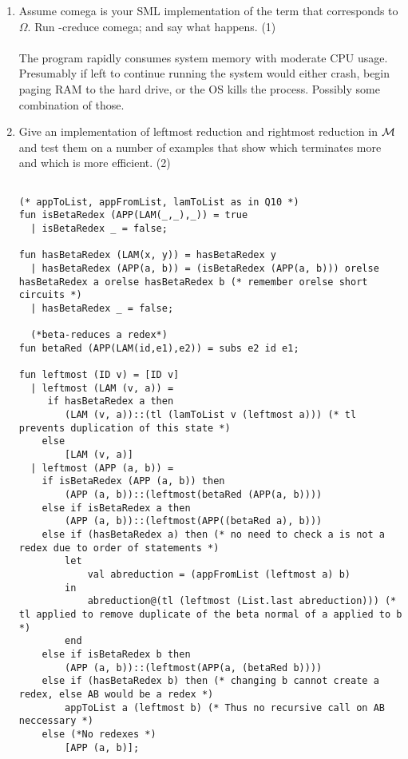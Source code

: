\documentclass[11pt]{article}
\begin{document}
\begin{enumerate}
\item
Assume comega is your SML implementation of the term that corresponds to $\Omega$.  Run -creduce comega; and say what happens.  
  \hfill{(1)} %
  \\ \\
  The program rapidly consumes system memory with moderate CPU usage. Presumably if left to continue running the system would either crash, begin paging RAM to the hard drive, or the OS kills the process. Possibly some combination of those.
\item
Give an implementation of leftmost reduction and rightmost reduction in ${\cal M}$ and test them on a number of examples that show which terminates more and which is more efficient. 
   \hfill{(2)} %

\begin{verbatim}

(* appToList, appFromList, lamToList as in Q10 *)
fun isBetaRedex (APP(LAM(_,_),_)) = true
  | isBetaRedex _ = false;

fun hasBetaRedex (LAM(x, y)) = hasBetaRedex y
  | hasBetaRedex (APP(a, b)) = (isBetaRedex (APP(a, b))) orelse hasBetaRedex a orelse hasBetaRedex b (* remember orelse short circuits *)
  | hasBetaRedex _ = false;
  
  (*beta-reduces a redex*)
fun betaRed (APP(LAM(id,e1),e2)) = subs e2 id e1;
  
fun leftmost (ID v) = [ID v]
  | leftmost (LAM (v, a)) =
	 if hasBetaRedex a then
		(LAM (v, a))::(tl (lamToList v (leftmost a))) (* tl prevents duplication of this state *)
	else
		[LAM (v, a)]
  | leftmost (APP (a, b)) =
	if isBetaRedex (APP (a, b)) then
		(APP (a, b))::(leftmost(betaRed (APP(a, b))))
	else if isBetaRedex a then
		(APP (a, b))::(leftmost(APP((betaRed a), b)))
	else if (hasBetaRedex a) then (* no need to check a is not a redex due to order of statements *)
		let
			val abreduction = (appFromList (leftmost a) b)
		in
			abreduction@(tl (leftmost (List.last abreduction))) (* tl applied to remove duplicate of the beta normal of a applied to b *)
		end
	else if isBetaRedex b then
		(APP (a, b))::(leftmost(APP(a, (betaRed b))))
	else if (hasBetaRedex b) then (* changing b cannot create a redex, else AB would be a redex *)
		appToList a (leftmost b) (* Thus no recursive call on AB neccessary *)
	else (*No redexes *)
		[APP (a, b)];


\end{verbatim}
\end{enumerate}
\end{document}

